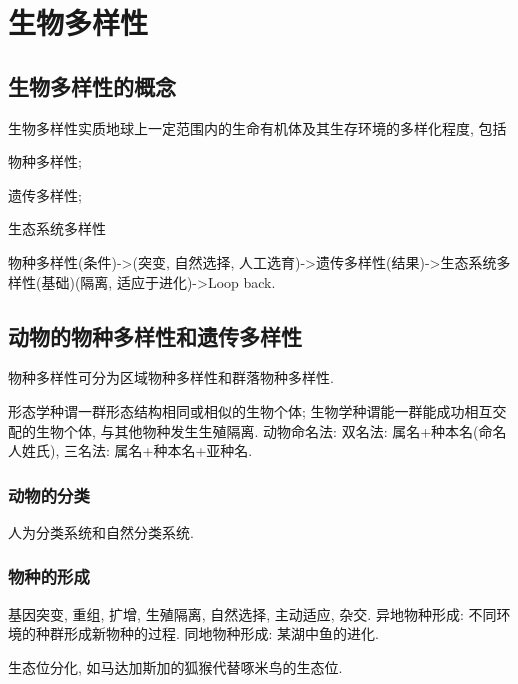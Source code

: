 \documentclass{ctexart}
\begin{document}
\section{生物多样性} %
\label{sec:生物多样性}

\subsection{生物多样性的概念} %
\label{sub:生物多样性的概念}

生物多样性实质地球上一定范围内的生命有机体及其生存环境的多样化程度, 包括
\begin{cenum}
    \item 物种多样性;
    \item 遗传多样性;
    \item 生态系统多样性
\end{cenum}
物种多样性(条件)->(突变, 自然选择, 人工选育)->遗传多样性(结果)->生态系统多样性(基础)(隔离, 适应于进化)->Loop back.


\subsection{动物的物种多样性和遗传多样性} %
\label{sub:动物的物种多样性和遗传多样性}

物种多样性可分为区域物种多样性和群落物种多样性.
\par
形态学种谓一群形态结构相同或相似的生物个体;
生物学种谓能一群能成功相互交配的生物个体, 与其他物种发生生殖隔离.
动物命名法: 双名法: 属名+种本名(命名人姓氏), 三名法: 属名+种本名+亚种名.

\subsubsection{动物的分类} %
\label{ssub:动物的分类}

人为分类系统和自然分类系统.


\subsubsection{物种的形成} %
\label{ssub:物种的形成}

基因突变, 重组, 扩增, 生殖隔离, 自然选择, 主动适应, 杂交. 异地物种形成: 不同环境的种群形成新物种的过程. 同地物种形成: 某湖中鱼的进化.
\begin{ex}
    生态位分化, 如马达加斯加的狐猴代替啄米鸟的生态位.
\end{ex}
\end{document}
